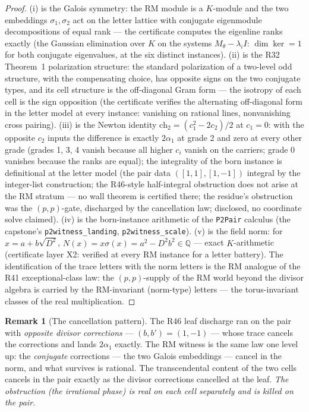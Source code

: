 \documentclass[11pt]{article}
\theoremstyle{definition}
\newtheorem{remark}[theorem]{Remark}
\begin{document}
\begin{proof}
(i) is the Galois symmetry: the RM module is a $K$-module and the two
embeddings $\sigma_1,\sigma_2$ act on the letter lattice with conjugate
eigenmodule decompositions of equal rank --- the certificate computes
the eigenline ranks exactly (the Gaussian elimination over $K$ on the
systems $M_\theta-\lambda_iI$: $\dim\ker=1$ for both conjugate
eigenvalues, at the six distinct instances). (ii) is the R32 Theorem~1 polarization
structure: the standard polarization of a two-level odd structure, with
the compensating choice, has opposite signs on the two conjugate types,
and its cell structure is the off-diagonal Gram form --- the isotropy of
each cell is the sign opposition (the certificate verifies the
alternating off-diagonal form in the letter model at every instance:
vanishing on rational lines, nonvanishing cross pairing). (iii) is the
Newton identity $\mathrm{ch}_2=(c_1^2-2c_2)/2$ at $c_1=0$: with the
opposite $c_2$ inputs the difference is exactly $2\alpha_1$ at grade 2
and zero at every other grade (grades 1, 3, 4 vanish because all higher
$c_i$ vanish on the carriers; grade 0 vanishes because the ranks are
equal); the integrality of the born instance is definitional at the
letter model (the pair data $([1,1],[1,-1])$ integral by the
integer-list construction; the R46-style half-integral obstruction does
not arise at the RM stratum --- no wall theorem is certified there; the
residue's obstruction was the $(p,p)$-gate, discharged by the
cancellation law; disclosed, no coordinate solve claimed). (iv) is the
born-instance arithmetic of the \texttt{P2Pair} calculus (the
capstone's \texttt{p2witness\_landing}, \texttt{p2witness\_scale}).
(v) is the field norm: for $x=a+b\sqrt{D^2}$,
$N(x)=x\sigma(x)=a^2-D^2b^2\in\mathbb{Q}$ --- exact $K$-arithmetic
(certificate layer X2: verified at every RM instance for a letter
battery). The identification of the trace letters with the norm letters
is the RM analogue of the R41 exceptional-class law: the
$(p,p)$-supply of the RM world beyond the divisor algebra is carried by
the RM-invariant (norm-type) letters --- the torus-invariant classes of
the real multiplication.
\end{proof}

\begin{remark}[The cancellation pattern]
The R46 leaf discharge ran on the pair with \emph{opposite divisor
corrections} --- $(b,b')=(1,-1)$ --- whose trace cancels the
corrections and lands $2\alpha_1$ exactly. The RM witness is the same
law one level up: the \emph{conjugate} corrections --- the two Galois
embeddings --- cancel in the norm, and what survives is rational. The
transcendental content of the two cells cancels in the pair exactly as
the divisor corrections cancelled at the leaf. \emph{The obstruction
(the irrational phase) is real on each cell separately and is killed on
the pair.}
\end{remark}
\end{document}
